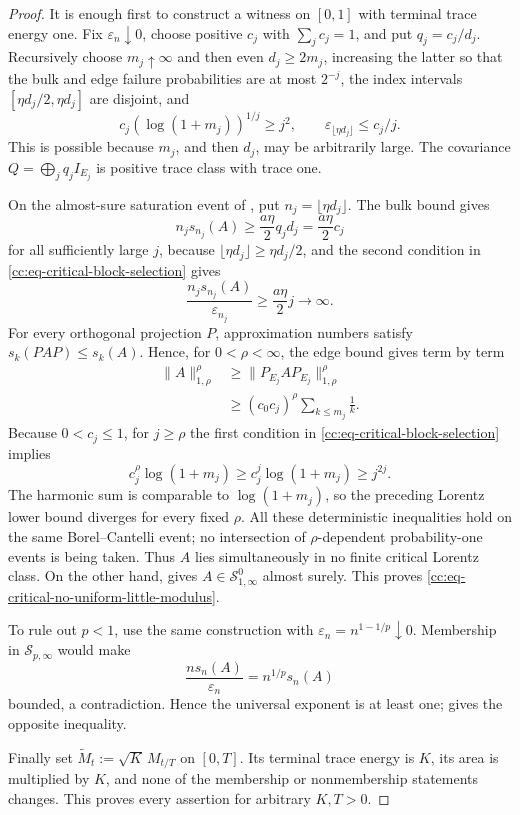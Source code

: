 \documentclass[10pt,reqno]{amsart}
\theoremstyle{plain}
\theoremstyle{definition}
\theoremstyle{remark}
\begin{document}
\begin{proof}
It is enough first to construct a witness on \([0,1]\) with terminal trace
energy one.  Fix \(\varepsilon_n\downarrow0\), choose positive \(c_j\)
with \(\sum_jc_j=1\), and put \(q_j=c_j/d_j\).  Recursively choose
\(m_j\uparrow\infty\) and then even \(d_j\geq2m_j\), increasing the latter
so that the bulk and edge failure probabilities are at most \(2^{-j}\),
the index intervals
\([\eta d_j/2,\eta d_j]\) are disjoint, and
\begin{equation}
 c_j(\log(1+m_j))^{1/j}\geq j^2,
 \qquad
 \varepsilon_{\lfloor\eta d_j\rfloor}\leq c_j/j.
 \label{cc:eq-critical-block-selection}
\end{equation}
This is possible because \(m_j\), and then \(d_j\), may be arbitrarily
large.  The covariance
\(Q=\bigoplus_jq_jI_{E_j}\) is positive trace class with trace one.

On the almost-sure saturation event of
, put
\(n_j=\lfloor\eta d_j\rfloor\).  The bulk bound gives
\[
 n_js_{n_j}(A)\geq\frac{a\eta}{2}q_jd_j
 =\frac{a\eta}{2}c_j
\]
for all sufficiently large \(j\), because
\(\lfloor\eta d_j\rfloor\geq\eta d_j/2\),
and the second condition in \eqref{cc:eq-critical-block-selection} gives
\[
 \frac{n_js_{n_j}(A)}{\varepsilon_{n_j}}
 \geq\frac{a\eta}{2}j\longrightarrow\infty.
\]
For every orthogonal projection \(P\), approximation numbers satisfy
\(s_k(PAP)\leq s_k(A)\).  Hence, for \(0<\rho<\infty\), the edge bound
gives term by term
\begin{align*}
 \|A\|_{1,\rho}^{\rho}
 &\geq\|P_{E_j}AP_{E_j}\|_{1,\rho}^{\rho}\\
 &\geq(c_0c_j)^{\rho}\sum_{k\leq m_j}\frac1k.
\end{align*}
Because \(0<c_j\leq1\), for \(j\geq\rho\) the first condition in
\eqref{cc:eq-critical-block-selection} implies
\[
 c_j^\rho\log(1+m_j)
 \geq c_j^j\log(1+m_j)\geq j^{2j}.
\]
The harmonic sum is comparable to \(\log(1+m_j)\), so the preceding
Lorentz lower bound diverges for every fixed \(\rho\).  All these
deterministic inequalities hold on the same Borel--Cantelli event; no
intersection of \(\rho\)-dependent probability-one events is being
taken.  Thus \(A\) lies simultaneously in no finite critical Lorentz
class.  On the other hand,
 gives
\(A\in\mathcal S^0_{1,\infty}\) almost surely.  This proves
\eqref{cc:eq-critical-no-uniform-little-modulus}.

To rule out \(p<1\), use the same construction with
\(\varepsilon_n=n^{1-1/p}\downarrow0\).  Membership in
\(\mathcal S_{p,\infty}\) would make
\[
 \frac{ns_n(A)}{\varepsilon_n}=n^{1/p}s_n(A)
\]
bounded, a contradiction.  Hence the universal exponent is at least one;
 gives the opposite
inequality.

Finally set \(\widetilde M_t:=\sqrt K\,M_{t/T}\) on \([0,T]\).  Its
terminal trace energy is \(K\), its area is multiplied by \(K\), and none
of the membership or nonmembership statements changes.  This proves every
assertion for arbitrary \(K,T>0\).
\end{proof}
\end{document}
